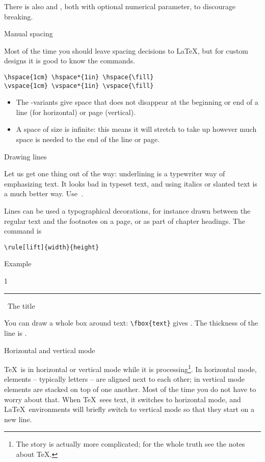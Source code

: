 There is also  and , both
with optional numerical parameter, to discourage breaking.

 {Manual spacing}
\label{sec:hvspace}

Most of the time you should leave spacing decisions to \LaTeX, but
for custom designs it is good to know the commands.
\begin{verbatim}
\hspace{1cm} \hspace*{1in} \hspace{\fill}
\vspace{1cm} \vspace*{1in} \vspace{\fill}
\end{verbatim}
\begin{itemize}
\item The \n{*}-variants give space that does not disappear at the
  beginning or end of a line (for horizontal) or page (vertical).
\item A space of size  is infinite: this means it will
  stretch to take up however much space is needed to the end of the
  line or page.
\end{itemize}

 {Drawing lines}

Let us get one thing out of the way: underlining is
a typewriter way of emphasizing text. It looks bad in typeset text,
and using italics or slanted text is a much better
way. Use~.

Lines can be used a typographical decorations, for instance drawn
between the regular text and the footnotes on a page, or as part of
chapter headings. The command is
\begin{verbatim}
\rule[lift]{width}{height}
\end{verbatim}
Example
\begin{examplewithcode}
1\ \rule{2cm}{\fboxrule}\ The title
\end{examplewithcode}
You can draw a whole box around text: \verb+\fbox{text}+ gives
. The thickness of the line is .

 {Horizontal and vertical mode}
\label{sec:hvmode}

\TeX\ is in horizontal or vertical mode while it is
processing\footnote{The story is actually more complicated; for the
  whole truth see the notes about \TeX.}. In horizontal mode, elements
-- typically letters --
are aligned next to each other; in vertical mode elements are stacked
on top of one another. Most of the time you do
not have to worry about that. When \TeX\ sees text, it switches to
horizontal mode, and \LaTeX\ environments will briefly switch to
vertical mode so that they start on a new line.

